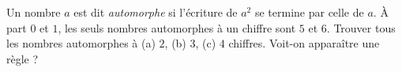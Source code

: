 Un nombre $a$ est dit \emph{automorphe} si l'écriture de $a^2$ se termine par celle de $a$. À part $0$ et $1$, les seuls nombres automorphes à un chiffre sont $5$ et $6$. Trouver tous les nombres automorphes à (a) $2$, (b) $3$, (c) $4$ chiffres. Voit-on apparaître une règle ?
